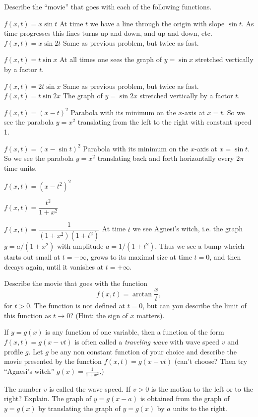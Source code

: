 \begin{multicols}{2}
\problem  Describe the ``movie'' that goes with each of the following 
functions.

\subprob $f(x, t) = x\sin t$
\answer
At time $t$ we have a line through the origin with slope $\sin t$.
As time progresses this lines turns up and down, and up and down,  etc.
\endanswer
\subprob $f(x, t) = x\sin 2t$
\answer
Same as previous problem, but twice as fast.
\endanswer

\subprob $f(x, t) = t\sin x$
\answer
At all times one sees the graph of $y=\sin x$ stretched vertically by a factor $t$.
\endanswer

\subprob $f(x, t) = 2t \sin x$
\answer
Same as previous problem, but twice as fast.
\endanswer
\subprob $f(x, t) = t\sin 2x$
\answer
The graph of $y=\sin 2x$ stretched vertically by a factor $t$.
\endanswer

\subprob $f(x, t) = (x-t)^2$
\answer
Parabola with its minimum on the $x$-axis at $x=t$.
So we see the parabola $y=x^2$ translating from the left to the right
with constant speed 1.
\endanswer

\subprob $f(x, t) = (x-\sin t)^2$
\answer
Parabola with its minimum on the $x$-axis at $x=\sin t$.
So we see the parabola $y=x^2$ translating back and forth horizontally
every $2\pi$ time units.
\endanswer

\subprob $f(x, t) = (x-t^2)^2$

\subprob $f(x, t) = \dfrac{t^2}{1+x^2}$

\subprob $f(x, t) = \dfrac{1}{(1+x^2) (1+t^2)}$
\answer
At time $t$ we see Agnesi's witch, i.e. the graph $y= a/(1+x^2)$
with amplitude $a=1/(1+t^2)$.  Thus we see a bump whcich starts out small
 at $t=-\infty$, grows to its maximal size at time $t=0$, and then decays
again, until it vanishes at $t=+\infty$.
\endanswer

\problem Describe the movie that goes with the function
\[
  f(x, t) = \arctan \frac xt,
\]
for $t>0$.  The function is not defined at $t=0$, but can you describe the limit
of this function as $t\to0$?  (Hint: the sign of $x$ matters).


\problem \label{prb:01traveling-waves}
If $y=g(x)$ is any function of one variable, then a function of the
form $f(x, t) = g(x-vt)$ is often called a \emph{traveling wave} with
wave speed $v$ and profile $g$.  Let $g$ be any non constant
function of your choice and describe the movie presented by the
function $f(x, t) = g(x-vt)$ (can't choose?  Then try ``Agnesi's
witch'' $g(x) = \frac{1}{1+x^2}$.)

The number $v$ is called the wave speed.  If $v>0$ is the motion to
the left or to the right? Explain.
\answer
The graph of $y=g(x-a)$ is obtained from the graph of $y=g(x)$ by
translating the graph of $y=g(x)$ by $a$ units to the right.


\end{multicols}
